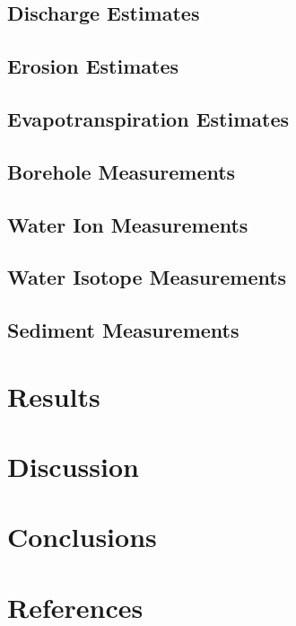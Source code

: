 \documentclass[hidelinks, 12pt]{article} %
\begin{document}
\subsection{Discharge Estimates}

\subsection{Erosion Estimates}

\subsection{Evapotranspiration Estimates}

\subsection{Borehole Measurements}

\subsection{Water Ion Measurements}

\subsection{Water Isotope Measurements}

\subsection{Sediment Measurements}


\section{Results}





\section{Discussion}




\section{Conclusions}


\section*{References}
\end{document}
